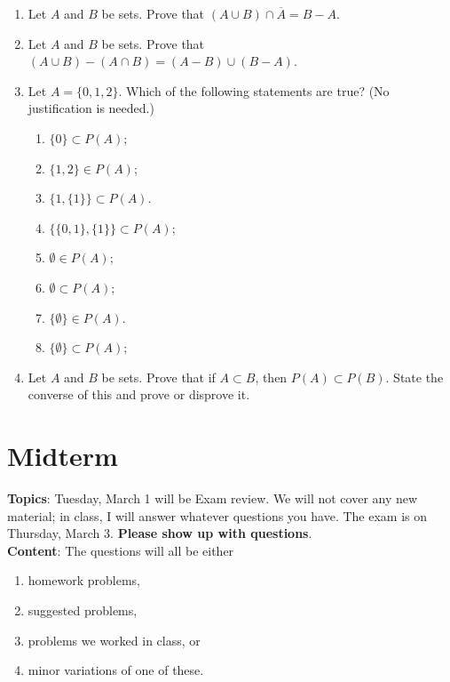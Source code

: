 \documentclass[12pt]{article}
\begin{document}
\begin{enumerate}
\item Let $A$ and $B$ be sets. Prove that $(A \cup B) \cap \overline{A} = B - A$.
\item Let $A$ and $B$ be sets. Prove that $(A \cup B) - (A \cap B) = (A - B) \cup (B - A)$.
\item Let $A = \{0,1,2\}$. Which of the following statements are true? (No justification is needed.)

 \begin{enumerate}
 \item $\{0\} \subset P(A)$;\vspace{0.3cm}
 \item $\{1,2\} \in P(A)$;\vspace{0.3cm}
 \item $\{1,\{1\}\} \subset P(A)$.\\ 
 \item $\{\{0,1\},\{1\}\} \subset P(A)$;\vspace{0.3cm}
 \item $\emptyset \in P(A)$;\vspace{0.3cm}
 \item $\emptyset \subset P(A)$;\vspace{0.3cm}
 \item $\{\emptyset\} \in P(A)$. \vspace{0.3cm}
 \item $\{\emptyset\} \subset P(A)$;\vspace{0.3cm}

 \end{enumerate}
\item Let $A$ and $B$ be sets. Prove that if $A \subset B$, then $P(A) \subset P(B)$. State the converse of this and prove or disprove it.

\end{enumerate}


\newpage
\section[ (March 3) Midterm ]{Midterm}

\textbf{Topics}: Tuesday, March 1 will be Exam review. We will not cover any new material; in class, I will answer whatever questions you have. The exam is on Thursday, March 3.
\textbf{Please show up with questions}.
\\

\noindent \textbf{Content}: The questions will all be either
\begin{enumerate}
\item homework problems,
\item suggested problems,
\item problems we worked in class, or
\item minor variations of one of these.
\end{enumerate}
\end{document}
